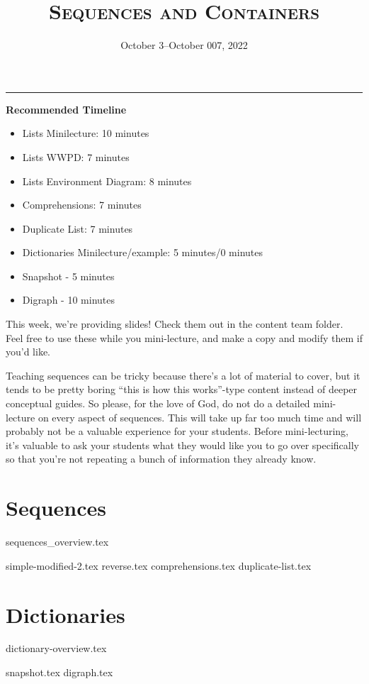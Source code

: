 \documentclass{exam}
\title{\textsc{Sequences and Containers}}
\date{October 3--October 007, 2022}
\begin{document}
\maketitle
\rule{\textwidth}{0.15em}
\fontsize{12}{15}\selectfont


\begin{meta}
    \textbf{Recommended Timeline}
    \begin{itemize}
        \item Lists Minilecture: 10 minutes
        \item Lists WWPD: 7 minutes
        \item Lists Environment Diagram: 8 minutes
        \item Comprehensions: 7 minutes
        \item Duplicate List: 7 minutes
        \item Dictionaries Minilecture/example: 5 minutes/0 minutes
        \item Snapshot - 5 minutes
        \item Digraph - 10 minutes
    \end{itemize}
    This week, we're providing slides! Check them out in the content team folder. Feel free to use these while you mini-lecture, and make a copy and modify them if you'd like. 

    Teaching sequences can be tricky because there's a lot of material to cover, but it tends to be pretty boring ``this is how this works''-type content instead of deeper conceptual guides. So please, for the love of God, do not do a detailed mini-lecture on every aspect of sequences. This will take up far too much time and will probably not be a valuable experience for your students. Before mini-lecturing, it's valuable to ask your students what they would like you to go over specifically so that you're not repeating a bunch of information they already know. 
\end{meta}

\section{Sequences}
{sequences_overview.tex}
\begin{questions}
    {simple-modified-2.tex}
    {reverse.tex}
    \newpage %
    {comprehensions.tex}
    {duplicate-list.tex}
\end{questions}

\section{Dictionaries}
{dictionary-overview.tex}
\begin{questions}
    {snapshot.tex}
    {digraph.tex}
\end{questions}
\end{document}
